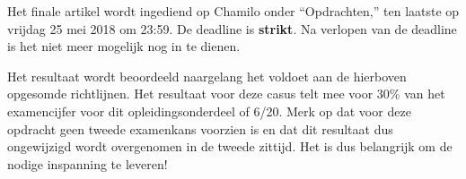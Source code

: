 \documentclass[fleqn,10pt]{voorstel}
\begin{document}
Het finale artikel wordt ingediend op Chamilo onder ``Opdrachten,'' ten laatste op vrijdag 25 mei 2018 om 23:59. De deadline is \textbf{strikt}. Na verlopen van de deadline is het niet meer mogelijk nog in te dienen.

Het resultaat wordt beoordeeld naargelang het voldoet aan de hierboven opgesomde richtlijnen. Het resultaat voor deze casus telt mee voor 30\% van het examencijfer voor dit opleidingsonderdeel of 6/20. Merk op dat voor deze opdracht geen tweede examenkans voorzien is en dat dit resultaat dus ongewijzigd wordt overgenomen in de tweede zittijd. Het is dus belangrijk om de nodige inspanning te leveren!


\printbibliography[heading=bibintoc]
\end{document}
